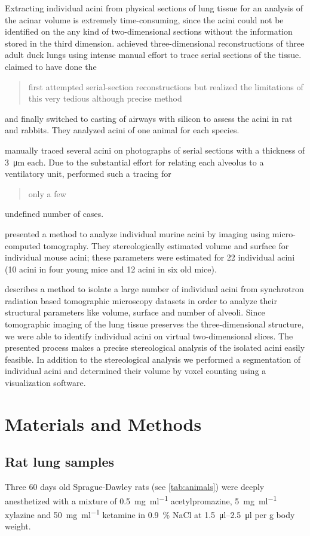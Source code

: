 \documentclass[final,paper=a4,DIV=calc,abstract,english]{scrartcl}
\begin{document}
Extracting individual acini from physical sections of lung tissue for an analysis of the acinar volume is extremely time-consuming, since the acini could not be identified on the any kind of two-dimensional sections without the information stored in the third dimension.
\citet{Woodward2005} achieved three-dimensional reconstructions of three adult duck lungs using intense manual effort to trace serial sections of the tissue.
\citet{Rodriguez1987} claimed to have done the \blockquote{first attempted serial-section reconstructions but realized the limitations of this very tedious although precise method} and finally switched to casting of airways with silicon to assess the acini in rat and rabbits.
They analyzed acini of one animal for each species.

\citet{Mercer1987a} manually traced several acini on photographs of serial sections with a thickness of \SI{3}{\micro\meter} each.
Due to the substantial effort for relating each alveolus to a ventilatory unit, \citeauthor{Mercer1987a} performed such a tracing for \blockquote{only a few} undefined number of cases.

\citet{Vasilescu2012} presented a method to analyze individual murine acini by imaging using micro-computed tomography.
They stereologically estimated volume and surface for individual mouse acini; these parameters were estimated for 22 individual acini (10 acini in four young mice and 12 acini in six old mice).

 describes a method to isolate a large number of individual acini from synchrotron radiation based tomographic microscopy datasets in order to analyze their structural parameters like volume, surface and number of alveoli.
Since tomographic imaging of the lung tissue preserves the three-dimensional structure, we were able to identify individual acini on virtual two-dimensional slices.
The presented process makes a precise stereological analysis of the isolated acini easily feasible.
In addition to the stereological analysis we performed a segmentation of individual acini and determined their volume by voxel counting using a visualization software.

\section{Materials and Methods}
\label{sec:materials and methods}
\subsection{Rat lung samples}
Three 60 days old Sprague-Dawley rats (see \autoref{tab:animals}) were deeply anesthetized with a mixture of %
\SI[per-mode=fraction]{0.5}{\milli\gram\per\milli\litre} acetylpromazine, %
\SI[per-mode=fraction]{5}{\milli\gram\per\milli\litre} xylazine and %
\SI[per-mode=fraction]{50}{\milli\gram\per\milli\litre} ketamine in %
\SI{0.9}{\percent} NaCl at \SIrange{1.5}{2.5}{\micro\litre} per \si{\gram} body weight.
\end{document}
